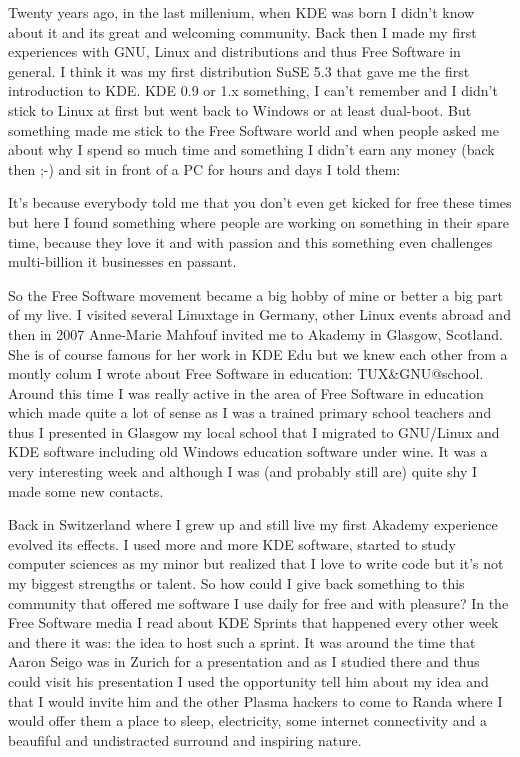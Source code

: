 


\noindent{}Twenty years ago, in the last millenium, when KDE was born I didn't know about it and its great and welcoming community. Back then I made my first experiences with GNU, Linux and distributions and thus Free Software in general. I think it was my first distribution SuSE 5.3 that gave me the first introduction to KDE. KDE 0.9 or 1.x something, I can't remember and I didn't stick to Linux at first but went back to Windows or at least dual-boot. But something made me stick to the Free Software world and when people asked me about why I spend so much time and something I didn't earn any money (back then ;-) and sit in front of a PC for hours and days I told them:

It's because everybody told me that you don't even get kicked for free these times but here I found something where people are working on something in their spare time, because they love it and with passion and this something even challenges multi-billion it businesses en passant.

So the Free Software movement became a big hobby of mine or better a big part of my live. I visited several Linuxtage in Germany, other Linux events abroad and then in 2007 Anne-Marie Mahfouf invited me to Akademy in Glasgow, Scotland. She is of course famous for her work in KDE Edu but we knew each other from a montly colum I wrote about Free Software in education: TUX\&GNU@school. Around this time I was really active in the area of Free Software in education which made quite a lot of sense as I was a trained primary school teachers and thus I presented in Glasgow my local school that I migrated to GNU/Linux and KDE software including old Windows education software under wine. It was a very interesting week and although I was (and probably still are) quite shy I made some new contacts.

Back in Switzerland where I grew up and still live my first Akademy experience evolved its effects. I used more and more KDE software, started to study computer sciences as my minor but realized that I love to write code but it's not my biggest strengths or talent. So how could I give back something to this community that offered me software I use daily for free and with pleasure? In the Free Software media I read about KDE Sprints that happened every other week and there it was: the idea to host such a sprint. It was around the time that Aaron Seigo was in Zurich for a presentation and as I studied there and thus could visit his presentation I used the opportunity tell him about my idea and that I would invite him and the other Plasma hackers to come to Randa where I would offer them a place to sleep, electricity, some internet connectivity and a beaufiful and undistracted surround and inspiring nature.

